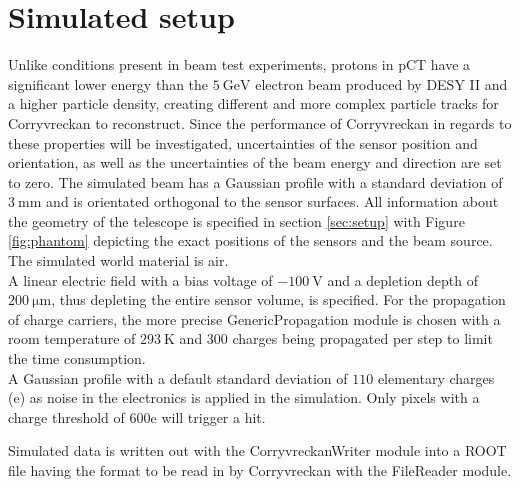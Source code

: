 \section{Simulated setup}
Unlike conditions present in beam test experiments, protons in pCT have a significant lower energy than the $\SI{5}{\giga\eV}$
electron beam produced by DESY II and a higher particle density, creating different and more complex particle tracks for
Corryvreckan to reconstruct. Since the performance of Corryvreckan in regards to these properties will be investigated, uncertainties
of the sensor position and orientation, as well as the uncertainties of the beam energy and direction are set to zero. The simulated
beam has a Gaussian profile with a standard deviation of $\SI{3}{\milli\meter}$ and is orientated orthogonal to the sensor
surfaces. All information about the geometry of the telescope is specified in section \ref{sec:setup} with
Figure \ref{fig:phantom} depicting the exact positions of the sensors and the beam source. The simulated world material is air.\\ %
A linear electric field with a bias voltage of $\SI{-100}{\volt}$ and a depletion depth of $\SI{200}{\micro\meter}$,
thus depleting the entire sensor volume, is specified. For the propagation of charge carriers, the more precise GenericPropagation
module is chosen with a room temperature of $\SI{293}{\kelvin}$ and 300 charges being propagated per step to limit the time consumption.\\
A Gaussian profile with a default standard deviation of $110$ elementary charges (e) as noise in the electronics is applied in the simulation.
Only pixels with a charge threshold of \mbox{$600$\;e} will trigger a hit.

Simulated data is written out with the CorryvreckanWriter module into a ROOT file having the format to be read
in by Corryvreckan with the FileReader module.

